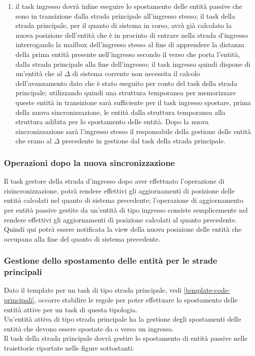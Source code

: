 \begin{enumerate}
\item il task ingresso dovrà infine eseguire lo spostamento delle entità passive che sono in transizione dalla strada principale all'ingresso stesso; il task della strada principale, per il quanto di sistema in corso, avrà già calcolato la nuova posizione dell'entità che è in procinto di entrare nella strada d'ingresso interrogando la mailbox dell'ingresso stesso al fine di apprendere la distanza della prima entità presente nell'ingresso secondo il verso che porta l'entità, dalla strada principale alla fine dell'ingresso; il task ingresso quindi dispone di un'entità che al $\Delta$ di sistema corrente non necessita il calcolo dell'avanzamento dato che è stato eseguito per conto del task della strada principale; utilizzando quindi una struttura temporanea per memorizzare queste entità in transizione sarà sufficiente per il task ingresso spostare, prima della nuova sincronizzazione, le entità dalla struttura temporanea alla struttura adibita per lo spostamento delle entità. Dopo la nuova sincronizzazione sarà l'ingresso stesso il responsabile della gestione delle entità che erano al $\Delta$ precedente in gestione dal task della strada principale.
\end{enumerate}

\subsubsection*{Operazioni dopo la nuova sincronizzazione} 
Il task gestore della strada d'ingresso dopo aver effettuato l'operazione di risincronizzazione, potrà rendere effettivi gli aggiornamenti di posizione delle entità calcolati nel quanto di sistema precedente; l'operazione di aggiornamento per entità passive gestite da un'entità di tipo ingresso consiste semplicemente nel rendere effettivi gli aggiornamenti di posizione calcolati al quanto precedente. Quindi qui potrà essere notificata la view della nuova posizione delle entità che occupano alla fine del quanto di sistema precedente.  
\subsubsection{Gestione dello spostamento delle entità per le strade principali}
Dato il template per un task di tipo strada principale, vedi \ref{template-code-principali}, occorre stabilire le regole per poter effettuare lo spostamento delle entità attive per un task di questa tipologia.\\
Un'entità attiva di tipo strada principale ha la gestione degli spostamenti
delle entità che devono essere spostate da o verso un ingresso. \\ Il task della
strada principale dovrà gestire lo spostamento di entità passive nelle
traiettorie riportate nelle figure sottostanti:

